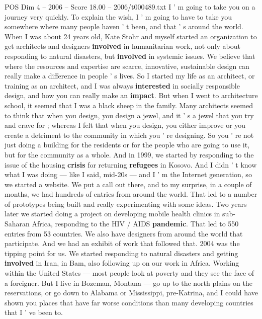 \begin{textsample}{POS Dim 4 – 2006 – Score 18.00 – 2006/t000489.txt}  \label{ex:f4_pos_008}
I ' m going to take you on a journey very quickly.
To explain the wish, I ' m going to have to take you somewhere where many people haven ' t been, and that ' s around the world.
When I was about 24 years old, Kate Stohr and myself started an organization to get architects and designers \textbf{involved} in humanitarian work, not only about responding to natural disasters, but \textbf{involved} in systemic issues.
We believe that where the resources and expertise are scarce, innovative, sustainable design can really make a difference in people ' s lives.
So I started my life as an architect, or training as an architect, and I was always \textbf{interested} in socially responsible design, and how you can really make an \textbf{impact}.
But when I went to architecture school, it seemed that I was a black sheep in the family.
Many architects seemed to think that when you design, you design a jewel, and it ' s a jewel that you try and crave for ; whereas I felt that when you design, you either improve or you create a detriment to the community in which you ' re designing.
So you ' re not just doing a building for the residents or for the people who are going to use it, but for the community as a whole.
And in 1999, we started by responding to the issue of the housing \textbf{crisis} for returning \textbf{refugees} in Kosovo.
And I didn ' t know what I was doing — like I said, mid-20s — and I ' m the Internet generation, so we started a website.
We put a call out there, and to my surprise, in a couple of months, we had hundreds of entries from around the world.
That led to a number of prototypes being built and really experimenting with some ideas.
Two years later we started doing a project on developing mobile health clinics in sub-Saharan Africa, responding to the HIV / AIDS \textbf{pandemic}.
That led to 550 entries from 53 countries.
We also have designers from around the world that participate.
And we had an exhibit of work that followed that. 2004 was the tipping point for us.
We started responding to natural disasters and getting \textbf{involved} in Iran, in Bam, also following up on our work in Africa.
Working within the United States — most people look at poverty and they see the face of a foreigner.
But I live in Bozeman, Montana — go up to the north plains on the reservations, or go down to Alabama or Mississippi, pre-Katrina, and I could have shown you places that have far worse conditions than many developing countries that I ' ve been to.

\end{textsample}
